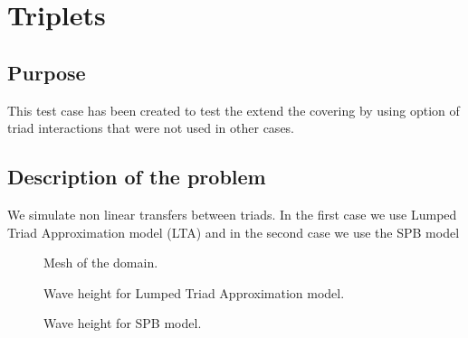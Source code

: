 \chapter{Triplets}
%
%
\section{Purpose}
%
This test case has been created to test the extend the covering by using
option of triad interactions that were not used in other cases.

%
\section{Description of the problem}
We simulate non linear transfers between triads. In the first case we use
Lumped Triad Approximation model (LTA) and in the second case we use the SPB
model
\begin{figure} [!h]
\centering
{}
 \caption{Mesh of the domain.}
\label{meshTriplet}
\end{figure}

\begin{figure} [!h]
\centering
{}
 \caption{Wave height for Lumped Triad Approximation model.}
\label{figrestripl}
\end{figure}
\begin{figure} [!h]
\centering
{}
 \caption{Wave height for SPB model.}
\label{figrestripl2}
\end{figure}

